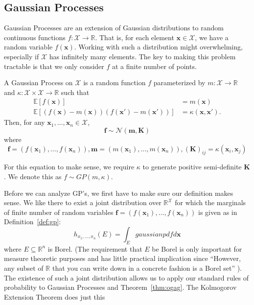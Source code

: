 \subsection{Gaussian Processes}

Gaussian Processes are an extension of Gaussian distributions to random continuous functions $f: \mathcal{X} \to \mathbb{R}$.
That is, for each element $\mathbf{x} \in \mathcal{X}$, we have a random variable $f(\mathbf{x})$.
Working with such a distribution might overwhelming, especially if $\mathcal{X}$ has infinitely many elements.
The key to making this problem tractable is that we only consider $f$ at a finite number of points.


\begin{definition}\label{def:gp}
    A Gaussian Process on $\mathcal{X}$ is a random function $f$ parameterized by
    $m: \mathcal{X} \to \mathbb{R}$ and $\kappa: \mathcal{X} \times \mathcal{X} \to \mathbb{R}$
    such that
    \begin{align*}
        \mathbb{E}[f(\mathbf{x})] &= m(\mathbf{x}) \\
        \mathbb{E}[(f(\mathbf{x}) - m(\mathbf{x}))(f(\mathbf{x}') - m(\mathbf{x}'))] &= \kappa(\mathbf{x}, \mathbf{x}').
    \end{align*}
    Then, for any $\mathbf{x}_1, \ldots,\mathbf{x}_n \in \mathcal{X}$,
    \begin{equation*}
        \mathbf{f} \sim \mathcal{N}\left(\mathbf{m}, \mathbf{K}\right)
    \end{equation*}
    where
    \begin{equation*}
        \mathbf{f} = (f(\mathbf{x}_1), \ldots, f(\mathbf{x}_n)), \mathbf{m} = (m(\mathbf{x}_1), \ldots, m(\mathbf{x}_n)), (\mathbf{K})_{ij} = \kappa(\mathbf{x}_i, \mathbf{x}_j)
    \end{equation*}
    
    For this equation to make sense, we require $\kappa$ to generate positive semi-definite $\mathbf{K}$.
    We denote this as $f \sim GP(m, \kappa)$.
\end{definition}

Before we can analyze GP's, we first have to make sure our definition makes sense.
We like there to exist a joint distribution over $\mathbb{R}^{\mathcal{X}}$
for which the marginals of finite number of random variables $\mathbf{f} = (f(\mathbf{x}_1), \ldots, f(\mathbf{x}_n))$ 
is given as in Definition~\ref{def:gp}:
\begin{equation*}
    h_{x_1, \ldots, x_n}(E) = \int_{E} gaussian pdf d \mathbf{x}
\end{equation*}
where $E \subseteq \mathbb{R}^{n}$ is Borel.
(The requirement that $E$ be Borel is only important for measure theoretic purposes and has little practical implication since ``However, any subset of $\mathbb{R}$ that you can write down in a concrete fashion is a Borel set'' \cite{axler2020}).
The existence of such a joint distribution allows us to apply our standard rules of probability to Gaussian Processes and Theorem~\ref{thm:ogag}.
The Kolmogorov Extension Theorem does just this

